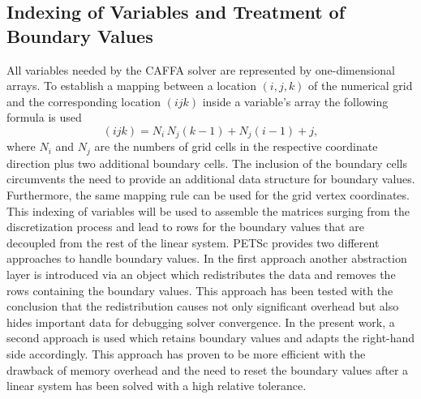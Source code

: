 \subsection{Indexing of Variables and Treatment of Boundary Values}

All variables needed by the CAFFA solver are represented by one-dimensional arrays. To establish a mapping between a location \((i,j,k)\) of the numerical grid and the corresponding location \((ijk)\) inside a variable's array the following formula is used
\begin{displaymath}
  (ijk) = N_i \, N_j \left(k - 1\right) + N_j \left(i - 1\right) + j,
\end{displaymath}
where \(N_i\) and \(N_j\) are the numbers of grid cells in the respective coordinate direction plus two additional boundary cells. The inclusion of the boundary cells circumvents the need to provide an additional data structure for boundary values. Furthermore, the same mapping rule can be used for the grid vertex coordinates. This indexing of variables will be used to assemble the matrices surging from the discretization process and lead to rows for the boundary values that are decoupled from the rest of the linear system. PETSc provides two different approaches to handle boundary values. In the first approach another abstraction layer is introduced via an object which redistributes the data and removes the rows containing the boundary values. This approach has been tested with the conclusion that the redistribution causes not only significant overhead but also hides important data for debugging solver convergence. In the present work, a second approach is used which retains boundary values and adapts the right-hand side accordingly. This approach has proven to be more efficient with the drawback of memory overhead and the need to reset the boundary values after a linear system has been solved with a high relative tolerance.

